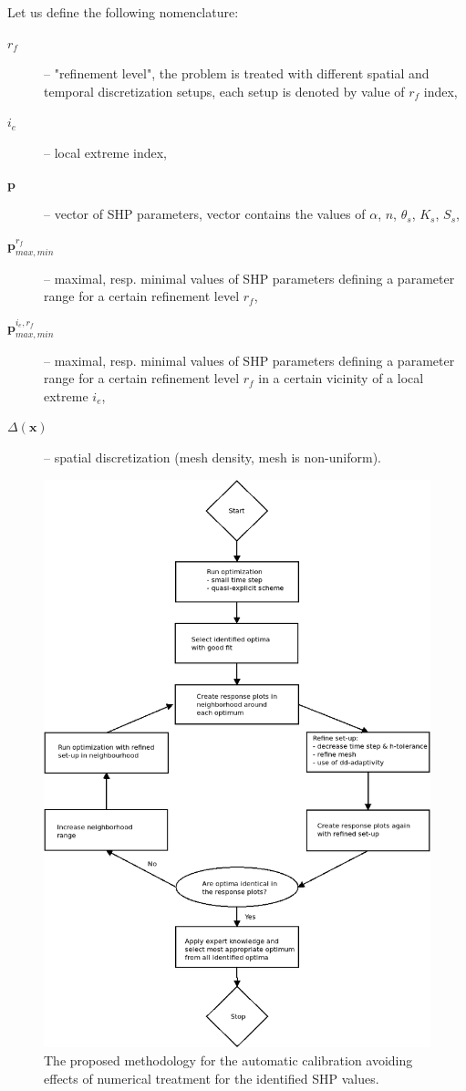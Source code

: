 \documentclass[review,times,3p,10pt]{elsarticle}
\renewcommand{\vec}{\mathbf}
\begin{document}
Let us define the following nomenclature: %

\hrulefill
\begin{description}
\item[$r_f$] -- "refinement level", the problem is treated with different spatial and temporal discretization setups, each setup is denoted by value of $r_f$ index,
\item[$i_e$] -- local extreme index,
\item[$\vec{p}$] -- vector of SHP parameters, vector contains the values of $\alpha$, $n$, $\theta_s$, $K_s$, $S_s$,
\item[$\vec{p}_{max,min}^{r_f}$] -- maximal, resp. minimal values of SHP parameters defining a parameter range for a certain refinement level $r_f$,
\item[$\vec{p}_{max,min}^{ i_e, r_f}$] -- maximal, resp. minimal values of SHP parameters defining a parameter range for a certain refinement level $r_f$ in a certain vicinity of a local extreme $i_e$,
\item[$\Delta(\vec{x})$] -- spatial discretization (mesh density, mesh is non-uniform).
\end{description}
\hrulefill


\begin{figure}
\centering
\includegraphics[width=12cm]{flowchart/Flow_chart_cb_new.png}
\caption{The proposed methodology for the automatic calibration avoiding effects of numerical treatment for the identified SHP values.}
\label{flowchart}
\end{figure}
\end{document}

